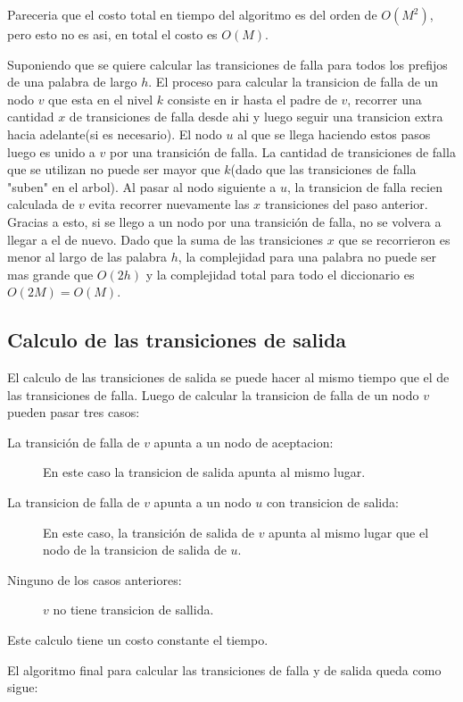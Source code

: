 \documentclass{article}
\begin{document}
Pareceria que el costo total en tiempo del algoritmo es del orden de $O(M^2)$, pero esto no es asi, en
total el costo es $O(M)$. 

Suponiendo que se quiere calcular las transiciones de falla para todos los prefijos de una palabra de largo
$h$. El proceso para calcular la transicion de falla de un nodo $v$ que esta en el nivel $k$ consiste en ir
hasta el padre de $v$, recorrer una cantidad $x$ de transiciones de falla desde ahi y luego seguir una transicion
extra hacia adelante(si es necesario). El nodo $u$ al que se llega haciendo estos pasos luego es unido a $v$ por
una transición de falla. La cantidad de transiciones de falla que se utilizan no puede ser mayor que $k$(dado que las
transiciones de falla "suben" en el arbol). Al pasar al nodo siguiente a $u$, la transicion de falla recien calculada
de $v$ evita recorrer nuevamente las $x$ transiciones del paso anterior. Gracias a esto, si se llego a un nodo por una
transición de falla, no se volvera a llegar a el de nuevo. Dado que la suma de las transiciones $x$ que se recorrieron
es menor al largo de las palabra $h$, la complejidad para una palabra no puede ser mas grande que $O(2h)$ y la complejidad
total para todo el diccionario es $O(2M) = O(M)$.

\subsection*{Calculo de las transiciones de salida}

El calculo de las transiciones de salida se puede hacer al mismo tiempo que el de las transiciones de falla. Luego de calcular
la transicion de falla de un nodo $v$ pueden pasar tres casos:

\begin{description}
    \item[La transición de falla de $v$ apunta a un nodo de aceptacion:] En este caso la transicion de salida apunta al mismo lugar.
    \item[La transicion de falla de $v$ apunta a un nodo $u$ con transicion de salida:] En este caso, la transición de salida de $v$ apunta al mismo
    lugar que el nodo de la transicion de salida de $u$.
    \item[Ninguno de los casos anteriores:] $v$ no tiene transicion de sallida.
\end{description}

Este calculo tiene un costo constante el tiempo.

El algoritmo final para calcular las transiciones de falla y de salida queda como sigue:
\end{document}
